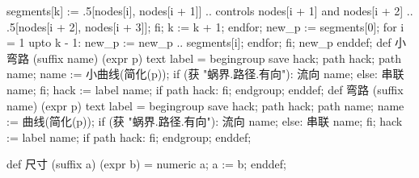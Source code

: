        segments[k] := .5[nodes[i], nodes[i + 1]] 
          .. controls nodes[i + 1] and nodes[i + 2] 
          .. .5[nodes[i + 2], nodes[i + 3]];
      fi;
      k := k + 1;
    endfor;
    new_p := segments[0];
    for i = 1 upto k - 1:
      new_p := new_p .. segments[i];
    endfor;
  fi;
  new_p
enddef;
def 小弯路 (suffix name) (expr p) text label =
  begingroup
  save hack; path hack;
  path name; name := 小曲线(简化(p));
  if (获 "蜗界.路径.有向"):
    流向 name;
  else:
    串联 name;
  fi;
  hack := label name;
  if path hack: fi;
  endgroup;
enddef;
def 弯路 (suffix name) (expr p) text label =
  begingroup
  save hack; path hack;
  path name; name := 曲线(简化(p));
  if (获 "蜗界.路径.有向"):
    流向 name;
  else:
    串联 name;
  fi;
  hack := label name;
  if path hack: fi;
  endgroup;
enddef;
\stopMPinclusions

\startMPinclusions[+]
def 尺寸 (suffix a) (expr b) =
  numeric a;
  a := b;
enddef;
\stopMPinclusions

